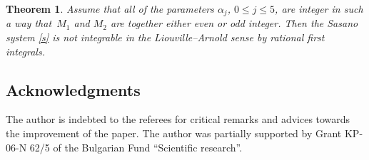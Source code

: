 \documentclass[10pt,a4paper]{amsart}
\numberwithin{equation}{section}
\newtheorem{Theorem}{Theorem}[section]
\begin{document}
 \begin{Theorem}\label{2}
 Assume that all of the parameters $\alpha_j$, $0 \leq j \leq 5$, are integer in such a way that~$M_1$ and $M_2$ are together either even or odd integer. Then the Sasano system
 \eqref{s} is not integrable in the Liouville--Arnold sense by rational first integrals.
 \end{Theorem}

 \subsection*{Acknowledgments}
 The author is indebted to the referees for critical remarks and advices towards the improvement of the paper.
The author was partially supported by Grant KP-06-N 62/5 of the Bulgarian Fund
 ``Scientific research''.

\end{document}
